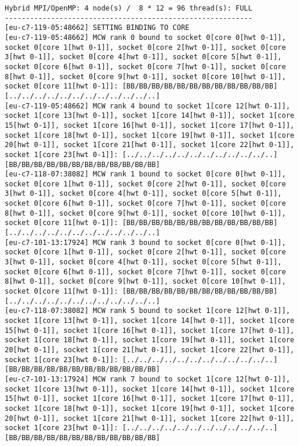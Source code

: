 \begin{lstlisting}[basicstyle=\tiny, frame=single, caption={Task 2: Collected Euler outputs.}, label={lst:1}]
Hybrid MPI/OpenMP: 4 node(s) /  8 * 12 = 96 thread(s): FULL
-----------------------------------------------------------
[eu-c7-119-05:48662] SETTING BINDING TO CORE
[eu-c7-119-05:48662] MCW rank 0 bound to socket 0[core 0[hwt 0-1]], socket 0[core 1[hwt 0-1]], socket 0[core 2[hwt 0-1]], socket 0[core 3[hwt 0-1]], socket 0[core 4[hwt 0-1]], socket 0[core 5[hwt 0-1]], socket 0[core 6[hwt 0-1]], socket 0[core 7[hwt 0-1]], socket 0[core 8[hwt 0-1]], socket 0[core 9[hwt 0-1]], socket 0[core 10[hwt 0-1]], socket 0[core 11[hwt 0-1]]: [BB/BB/BB/BB/BB/BB/BB/BB/BB/BB/BB/BB][../../../../../../../../../../../..]
[eu-c7-119-05:48662] MCW rank 4 bound to socket 1[core 12[hwt 0-1]], socket 1[core 13[hwt 0-1]], socket 1[core 14[hwt 0-1]], socket 1[core 15[hwt 0-1]], socket 1[core 16[hwt 0-1]], socket 1[core 17[hwt 0-1]], socket 1[core 18[hwt 0-1]], socket 1[core 19[hwt 0-1]], socket 1[core 20[hwt 0-1]], socket 1[core 21[hwt 0-1]], socket 1[core 22[hwt 0-1]], socket 1[core 23[hwt 0-1]]: [../../../../../../../../../../../..][BB/BB/BB/BB/BB/BB/BB/BB/BB/BB/BB/BB]
[eu-c7-118-07:38082] MCW rank 1 bound to socket 0[core 0[hwt 0-1]], socket 0[core 1[hwt 0-1]], socket 0[core 2[hwt 0-1]], socket 0[core 3[hwt 0-1]], socket 0[core 4[hwt 0-1]], socket 0[core 5[hwt 0-1]], socket 0[core 6[hwt 0-1]], socket 0[core 7[hwt 0-1]], socket 0[core 8[hwt 0-1]], socket 0[core 9[hwt 0-1]], socket 0[core 10[hwt 0-1]], socket 0[core 11[hwt 0-1]]: [BB/BB/BB/BB/BB/BB/BB/BB/BB/BB/BB/BB][../../../../../../../../../../../..]
[eu-c7-101-13:17924] MCW rank 3 bound to socket 0[core 0[hwt 0-1]], socket 0[core 1[hwt 0-1]], socket 0[core 2[hwt 0-1]], socket 0[core 3[hwt 0-1]], socket 0[core 4[hwt 0-1]], socket 0[core 5[hwt 0-1]], socket 0[core 6[hwt 0-1]], socket 0[core 7[hwt 0-1]], socket 0[core 8[hwt 0-1]], socket 0[core 9[hwt 0-1]], socket 0[core 10[hwt 0-1]], socket 0[core 11[hwt 0-1]]: [BB/BB/BB/BB/BB/BB/BB/BB/BB/BB/BB/BB][../../../../../../../../../../../..]
[eu-c7-118-07:38082] MCW rank 5 bound to socket 1[core 12[hwt 0-1]], socket 1[core 13[hwt 0-1]], socket 1[core 14[hwt 0-1]], socket 1[core 15[hwt 0-1]], socket 1[core 16[hwt 0-1]], socket 1[core 17[hwt 0-1]], socket 1[core 18[hwt 0-1]], socket 1[core 19[hwt 0-1]], socket 1[core 20[hwt 0-1]], socket 1[core 21[hwt 0-1]], socket 1[core 22[hwt 0-1]], socket 1[core 23[hwt 0-1]]: [../../../../../../../../../../../..][BB/BB/BB/BB/BB/BB/BB/BB/BB/BB/BB/BB]
[eu-c7-101-13:17924] MCW rank 7 bound to socket 1[core 12[hwt 0-1]], socket 1[core 13[hwt 0-1]], socket 1[core 14[hwt 0-1]], socket 1[core 15[hwt 0-1]], socket 1[core 16[hwt 0-1]], socket 1[core 17[hwt 0-1]], socket 1[core 18[hwt 0-1]], socket 1[core 19[hwt 0-1]], socket 1[core 20[hwt 0-1]], socket 1[core 21[hwt 0-1]], socket 1[core 22[hwt 0-1]], socket 1[core 23[hwt 0-1]]: [../../../../../../../../../../../..][BB/BB/BB/BB/BB/BB/BB/BB/BB/BB/BB/BB]

\end{lstlisting}
